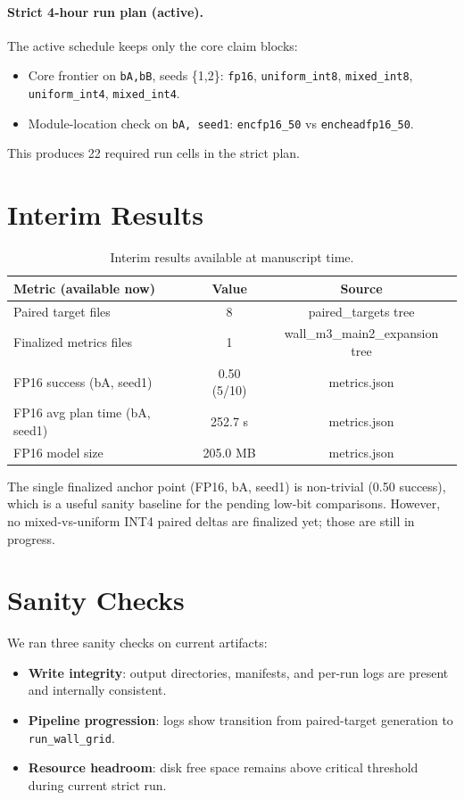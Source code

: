 \documentclass{article}
\begin{document}
\paragraph{Strict 4-hour run plan (active).}
The active schedule keeps only the core claim blocks:
\begin{itemize}
  \item Core frontier on \texttt{bA,bB}, seeds \{1,2\}: \texttt{fp16}, \texttt{uniform\_int8}, \texttt{mixed\_int8}, \texttt{uniform\_int4}, \texttt{mixed\_int4}.
  \item Module-location check on \texttt{bA, seed1}: \texttt{encfp16\_50} vs \texttt{encheadfp16\_50}.
\end{itemize}
This produces 22 required run cells in the strict plan.

\section{Interim Results}
\begin{table}[t]
\centering
\small
\begin{tabular}{lcc}
\toprule
Metric (available now) & Value & Source \\
\midrule
Paired target files & 8 & paired\_targets tree \\
Finalized metrics files & 1 & wall\_m3\_main2\_expansion tree \\
FP16 success (bA, seed1) & 0.50 (5/10) & metrics.json \\
FP16 avg plan time (bA, seed1) & 252.7 s & metrics.json \\
FP16 model size & 205.0 MB & metrics.json \\
\bottomrule
\end{tabular}
\caption{Interim results available at manuscript time.}
\label{tab:interim}
\end{table}

The single finalized anchor point (FP16, bA, seed1) is non-trivial (0.50 success), which is a useful sanity baseline for the pending low-bit comparisons.
However, no mixed-vs-uniform INT4 paired deltas are finalized yet; those are still in progress.

\section{Sanity Checks}
We ran three sanity checks on current artifacts:
\begin{itemize}
  \item \textbf{Write integrity}: output directories, manifests, and per-run logs are present and internally consistent.
  \item \textbf{Pipeline progression}: logs show transition from paired-target generation to \texttt{run\_wall\_grid}.
  \item \textbf{Resource headroom}: disk free space remains above critical threshold during current strict run.
\end{itemize}
\end{document}
